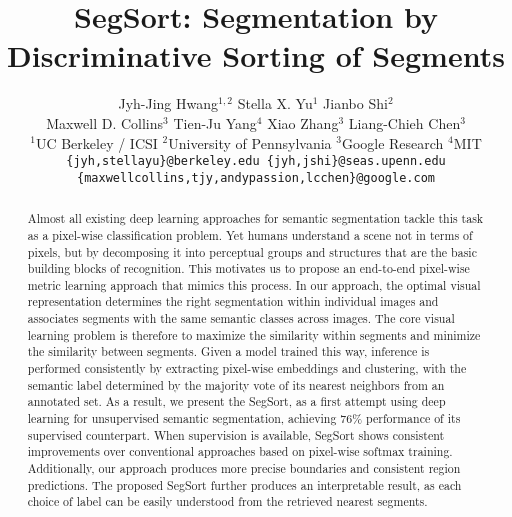 \documentclass[10pt,twocolumn,letterpaper]{article}
\begin{document}
\title{SegSort: Segmentation by Discriminative Sorting of Segments}

\author{
Jyh-Jing Hwang$^{1,2}$ \quad Stella X. Yu$^1$ \quad Jianbo Shi$^2$\\ 
Maxwell D. Collins$^3$ \quad Tien-Ju Yang$^4$ \quad Xiao Zhang$^3$ \quad Liang-Chieh Chen$^3$ \\
$^1$UC Berkeley / ICSI \quad $^2$University of Pennsylvania \quad $^3$Google Research \quad $^4$MIT\\
{\tt \small \{jyh,stellayu\}@berkeley.edu  \quad \{jyh,jshi\}@seas.upenn.edu} \\
{\tt \small \{maxwellcollins,tjy,andypassion,lcchen\}@google.com}
}





\maketitle
\ificcvfinal\thispagestyle{empty}\fi

\maketitle




\begin{abstract}
Almost all existing deep learning approaches for semantic segmentation tackle this task as a pixel-wise classification problem.
Yet humans understand a scene not in terms of pixels, but by decomposing it into perceptual groups and structures that are the basic building blocks of recognition.
This motivates us to propose an end-to-end pixel-wise metric learning approach that mimics this process.
In our approach, the optimal visual representation determines the right segmentation within individual images and associates segments with the same semantic classes across images.
The core visual learning problem is therefore to maximize the similarity within segments and minimize  the similarity between segments.
Given a model trained this way, inference is performed consistently by extracting pixel-wise embeddings and clustering, with the semantic label determined by the majority vote of its nearest neighbors from an annotated set.
As a result, we present the SegSort, as a first attempt using deep learning for unsupervised semantic segmentation, achieving $76\%$ performance of its supervised counterpart.
When supervision is available, SegSort shows consistent improvements over conventional approaches based on pixel-wise softmax training.
Additionally, our approach produces more precise boundaries and consistent region predictions.
The proposed SegSort further produces an interpretable result, as each choice of label can be easily understood from the retrieved nearest segments.



\end{abstract}
\end{document}
